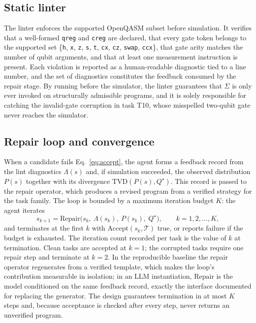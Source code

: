 \documentclass[11pt,a4paper]{article}
\newcommand{\tvd}{\mathrm{TVD}}
\begin{document}
\subsection{Static linter}
The linter enforces the supported OpenQASM subset before simulation. It verifies that a well-formed \texttt{qreg} and \texttt{creg} are declared, that every gate token belongs to the supported set \{\texttt{h}, \texttt{x}, \texttt{z}, \texttt{s}, \texttt{t}, \texttt{cx}, \texttt{cz}, \texttt{swap}, \texttt{ccx}\}, that gate arity matches the number of qubit arguments, and that at least one measurement instruction is present. Each violation is reported as a human-readable diagnostic tied to a line number, and the set of diagnostics constitutes the feedback consumed by the repair stage. By running before the simulator, the linter guarantees that $\Sigma$ is only ever invoked on structurally admissible programs, and it is solely responsible for catching the invalid-gate corruption in task T10, whose misspelled two-qubit gate never reaches the simulator.

\subsection{Repair loop and convergence}
When a candidate fails Eq.~\eqref{eq:accept}, the agent forms a feedback record from the lint diagnostics $\Lambda(s)$ and, if simulation succeeded, the observed distribution $P(s)$ together with its divergence $\tvd(P(s),Q^{\star})$. This record is passed to the repair operator, which produces a revised program from a verified strategy for the task family. The loop is bounded by a maximum iteration budget $K$: the agent iterates
\begin{equation}
s_{k+1}=\mathrm{Repair}\bigl(s_k,\ \Lambda(s_k),\ P(s_k),\ Q^{\star}\bigr),\qquad k=1,2,\dots,K,
\label{eq:repair}
\end{equation}
and terminates at the first $k$ with $\mathrm{Accept}(s_k,\mathcal{T})$ true, or reports failure if the budget is exhausted. The iteration count recorded per task is the value of $k$ at termination. Clean tasks are accepted at $k=1$; the corrupted tasks require one repair step and terminate at $k=2$. In the reproducible baseline the repair operator regenerates from a verified template, which makes the loop's contribution measurable in isolation; in an LLM instantiation, $\mathrm{Repair}$ is the model conditioned on the same feedback record, exactly the interface documented for replacing the generator. The design guarantees termination in at most $K$ steps and, because acceptance is checked after every step, never returns an unverified program.
\end{document}
